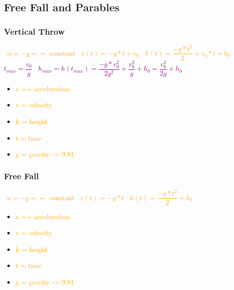 \documentclass[main.tex,fontsize=8pt,paper=a4,paper=portrait,DIV=calc,]{scrartcl}
\begin{document}
\begin{multicols*}{2}
\subsection{Free Fall and Parables}
\subsubsection{Vertical Throw}
\, \newline
\large \textcolor{orange}{\( \alpha = -g == \text{ constant}  \)}\newline
\, \newline
\large \textcolor{orange}{\( v(t) = -g * t + v_0 \)}\newline
\, \newline
\large \textcolor{orange}{\( h(t) = \dfrac{-g * t^2}{2} + v_o * t + h_0  \)}\newline
\, \newline
\large \textcolor{purple}{\( t_{max} = \dfrac{v_0}{g} \)}\newline
\, \newline
\large \textcolor{purple}{\( h_{max} = h(t_{max}) = \dfrac{-g * v^{2}_{0}}{2 g^2 } + \dfrac{v_{0}^{2}}{g} + h_0 = \dfrac{v_{0}^{2}}{2g} + h_0 \)}\newline
\, \newline \normalsize
\begin{itemize}
\item \textcolor{orange}{a == acceleration}
\item \textcolor{orange}{v = velocity}
\item \textcolor{orange}{h = height}
\item \textcolor{orange}{t = time}
\item \textcolor{orange}{g = gravity -> 9.81}
\end{itemize} 

\subsubsection{Free Fall}
\, \newline
\large \textcolor{orange}{\( a = -g == \text{ constant} \)}\newline
\, \newline
\large \textcolor{orange}{\(v(t) = -g * t\)}\newline
\, \newline
\large \textcolor{orange}{\(h(t) = \dfrac{-g * t^2}{2} + h_0\)}\newline
\, \newline \normalsize
\begin{itemize}
\item \textcolor{orange}{a == acceleration}
\item \textcolor{orange}{v = velocity}
\item \textcolor{orange}{h = height}
\item \textcolor{orange}{t = time}
\item \textcolor{orange}{g = gravity -> 9.81}
\end{itemize} 


\end{multicols*}
\end{document}
